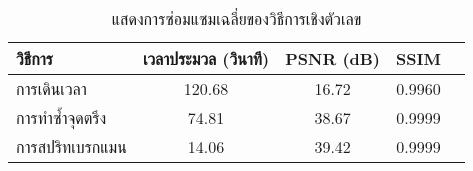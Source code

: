 \begin{table}[H]
    \centering
    \begin{tabular}[ht]{|l|c|c|c|c|}
        \hline
        วิธีการ  & เวลาประมวล  (วินาที) & PSNR (dB) & SSIM \\
        \hline
        การเดินเวลา & 120.68 & 16.72 & 0.9960 \\
        การทำซ้ำจุดตรึง & 74.81 & 38.67 & 0.9999 \\
        การสปริทเบรกแมน & 14.06 & 39.42 & 0.9999  \\
        \hline
    \end{tabular}
    \caption{แสดงการซ่อมแซมเฉลี่ยของวิธีการเชิงตัวเลข}
\end{table}	
